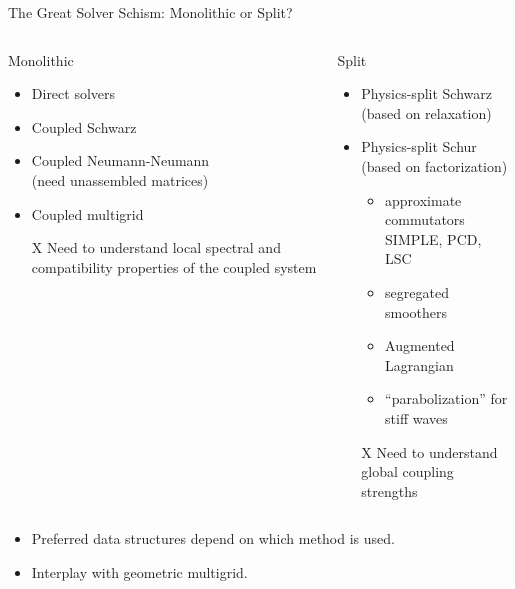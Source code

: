 \begin{frame}{The Great Solver Schism: Monolithic or Split?}
  \begin{columns}
    \begin{column}{0.5\textwidth}
      \begin{block}{Monolithic}
        \begin{itemize}
        \item Direct solvers
        \item Coupled Schwarz
        \item Coupled Neumann-Neumann \\
          (need unassembled matrices)
        \item Coupled multigrid
        \item[X] Need to understand local spectral and compatibility properties of the coupled system
        \end{itemize}
      \end{block}
    \end{column}
    \begin{column}{0.5\textwidth}
      \begin{block}{Split}
        \begin{itemize}
        \item Physics-split Schwarz \\
          (based on relaxation)
        \item Physics-split Schur \\
          (based on factorization)
          \begin{itemize}
          \item  approximate commutators \\
            SIMPLE, PCD, LSC
          \item segregated smoothers
          \item Augmented Lagrangian
          \item ``parabolization'' for stiff waves
          \end{itemize}
        \item[X] Need to understand global coupling strengths
        \end{itemize}
      \end{block}
    \end{column}
  \end{columns}
  \begin{itemize}
  \item Preferred data structures depend on which method is used.
  \item Interplay with geometric multigrid.
  \end{itemize}
\end{frame}
